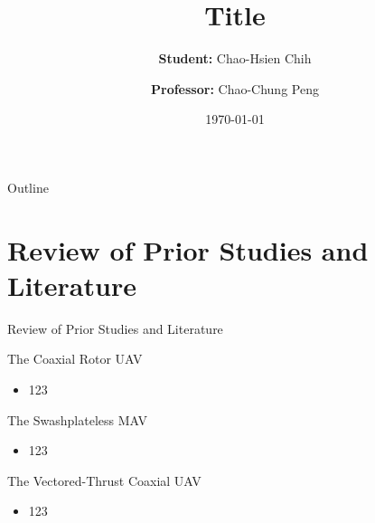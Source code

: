 \documentclass[10pt,xcolor={x11names}]{beamer}
\title[Short Title]{Title}
\author[P46104269@gs.ncku.edu.tw]{\textbf{Student:} Chao-Hsien Chih \and \textbf{Professor:} Chao-Chung Peng }
\institute[NCKU-IAA IEC-Lab] %
{

    \begin{tabular}{cc}
        \begin{minipage}{0.15\linewidth}
            \begin{figure}
                \texttt{[image: IEC\_Lab\_Logo.png]}
            \end{figure}
        \end{minipage}
        &
        \begin{minipage}{0.6\linewidth}
            Intelligent Embedded Control Lab (IEC-Lab) \\
            Department of Aeronautics and Astronautics \\
            National Cheng Kung University \\
            Tainan, Taiwan 
        \end{minipage}
    \end{tabular}
}
\date{\today}
\begin{document}
\begin{frame}
    \maketitle
\end{frame}

\begin{frame}{Outline}
    \tableofcontents
\end{frame}

\section{Review of Prior Studies and Literature}

\begin{frame}{Review of Prior Studies and Literature}
    \begin{block}{The Coaxial Rotor UAV}
        \begin{itemize}
            \item 123
        \end{itemize}
    \end{block}
    \begin{alertblock}{The Swashplateless MAV}
        \begin{itemize}
            \item 123
        \end{itemize}
    \end{alertblock}
    \begin{exampleblock}{The Vectored-Thrust Coaxial UAV}
        \begin{itemize}
            \item 123
        \end{itemize}
    \end{exampleblock}
\end{frame}
\end{document}
